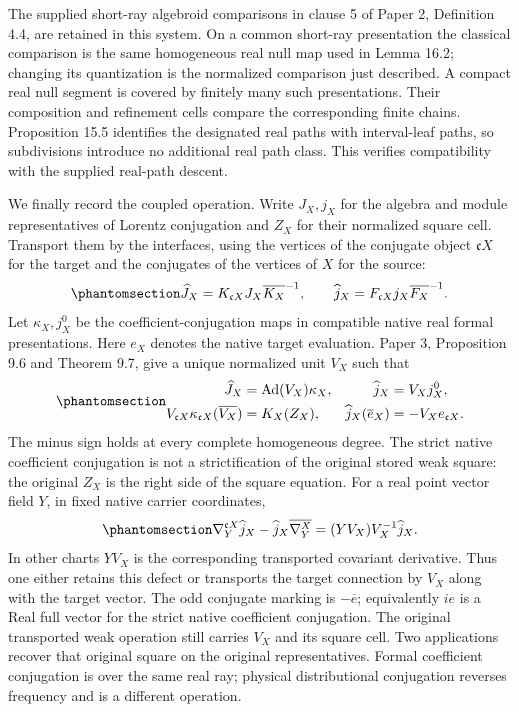 \documentclass[
  english,
  11pt,
  reqno]{amsart}
\begin{document}
The supplied short-ray algebroid comparisons in clause 5 of Paper 2,
Definition 4.4, are retained in this system. On a common short-ray
presentation the classical comparison is the same homogeneous real null
map used in Lemma 16.2; changing its quantization is the normalized
comparison just described. A compact real null segment is covered by
finitely many such presentations. Their composition and refinement cells
compare the corresponding finite chains. Proposition 15.5 identifies the
designated real paths with interval-leaf paths, so subdivisions
introduce no additional real path class. This verifies compatibility
with the supplied real-path descent.

We finally record the coupled operation. Write \(J_X,j_X\) for the
algebra and module representatives of Lorentz conjugation and \(Z_X\)
for their normalized square cell. Transport them by the interfaces,
using the vertices of the conjugate object \(\mathfrak cX\) for the
target and the conjugates of the vertices of \(X\) for the source:
\begin{equation}\protect\phantomsection\label{eq:analytic-global-coupled-interface}{
\widehat J_X=K_{\mathfrak cX}J_X\overline{K_X}^{-1},
\qquad
\widehat j_X=F_{\mathfrak cX}j_X\overline{F_X}^{-1}.
}\end{equation} Let \(\kappa_X,j_X^0\) be the coefficient-conjugation
maps in compatible native real formal presentations. Here \(e_X\)
denotes the native target evaluation. Paper 3, Proposition 9.6 and
Theorem 9.7, give a unique normalized unit \(V_X\) such that
\begin{equation}\protect\phantomsection\label{eq:analytic-global-coupled-square-and-vector}{
\begin{aligned}
\widehat J_X&=\operatorname{Ad}(V_X)\kappa_X,
&\widehat j_X&=V_Xj_X^0,\\
V_{\mathfrak cX}\kappa_{\mathfrak cX}(\overline{V_X})
 &=K_X(Z_X),
&\widehat j_X(\overline e_X)&=-V_Xe_{\mathfrak cX}.
\end{aligned}
}\end{equation} The minus sign holds at every complete homogeneous
degree. The strict native coefficient conjugation is not a
strictification of the original stored weak square: the original \(Z_X\)
is the right side of the square equation. For a real point vector field
\(Y\), in fixed native carrier coordinates,
\begin{equation}\protect\phantomsection\label{eq:analytic-global-coupled-connection-defect}{
\nabla_Y^{\mathfrak cX}\widehat j_X
 -\widehat j_X\overline{\nabla_Y^X}
 =(YV_X)V_X^{-1}\widehat j_X.
}\end{equation} In other charts \(YV_X\) is the corresponding
transported covariant derivative. Thus one either retains this defect or
transports the target connection by \(V_X\) along with the target
vector. The odd conjugate marking is \(-\overline e\); equivalently
\(ie\) is a Real full vector for the strict native coefficient
conjugation. The original transported weak operation still carries
\(V_X\) and its square cell. Two applications recover that original
square on the original representatives. Formal coefficient conjugation
is over the same real ray; physical distributional conjugation reverses
frequency and is a different operation.
\end{document}

